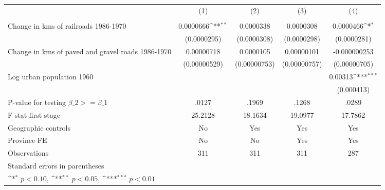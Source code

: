 {
\def\sym#1{\ifmmode^{#1}\else\(^{#1}\)\fi}
\begin{tabular}{l*{4}{c}}
\hline\hline
                &\multicolumn{1}{c}{(1)}&\multicolumn{1}{c}{(2)}&\multicolumn{1}{c}{(3)}&\multicolumn{1}{c}{(4)}\\
                &\multicolumn{1}{c}{}&\multicolumn{1}{c}{}&\multicolumn{1}{c}{}&\multicolumn{1}{c}{}\\
\hline
Change in kms of railroads 1986-1970&0.0000666\sym{**} &0.0000338         &0.0000308         &0.0000466\sym{*}  \\
                &(0.0000295)         &(0.0000308)         &(0.0000298)         &(0.0000281)         \\
[1em]
Change in kms of paved and gravel roads 1986-1970&0.00000718         &0.0000105         &0.00000101         &-0.000000253         \\
                &(0.00000529)         &(0.00000753)         &(0.00000757)         &(0.00000705)         \\
[1em]
Log urban population 1960&                  &                  &                  &  0.00313\sym{***}\\
                &                  &                  &                  &(0.000413)         \\
\hline
P-value for testing $\beta\_{2} >= \beta\_{1}$&    .0127         &    .1969         &    .1268         &    .0289         \\
F-stat first stage&  25.2128         &  18.1634         &  19.0977         &  17.7862         \\
Geographic controls&       No         &      Yes         &      Yes         &      Yes         \\
Province FE     &       No         &       No         &      Yes         &      Yes         \\
Observations    &      311         &      311         &      311         &      287         \\
\hline\hline
\multicolumn{5}{l}{\footnotesize Standard errors in parentheses}\\
\multicolumn{5}{l}{\footnotesize \sym{*} \(p<0.10\), \sym{**} \(p<0.05\), \sym{***} \(p<0.01\)}\\
\end{tabular}
}
